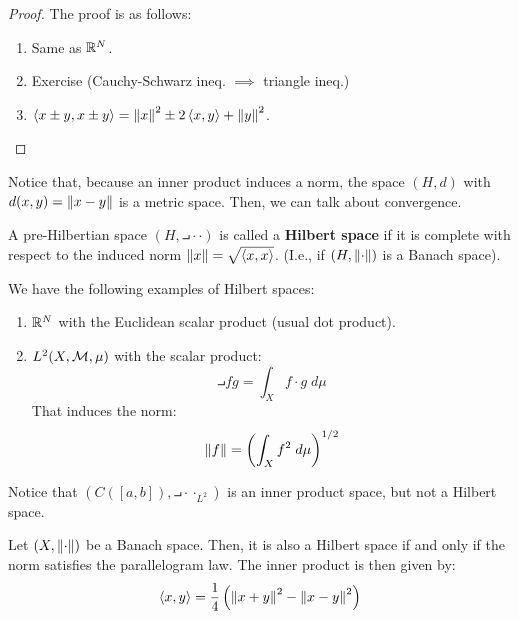 \begin{proof}
    The proof is as follows:
    \begin{enumerate}[label=\arabic*)]
        \item Same as $\mathbb{R}^N$.
        \item Exercise (Cauchy-Schwarz ineq. $\implies$ triangle ineq.)
        \item $\left\langle x \pm y, x \pm y \right\rangle = \left\|x\right\|^2 \pm 2\left\langle x, y \right\rangle + \left\|y\right\|^2$.
    \end{enumerate}
\end{proof}

\begin{fremark}
    Notice that, because an inner product induces a norm, the space $(H, d)$ with
    $d(x, y) = \left\|x - y\right\|$ is a metric space. Then, we can talk about convergence.
\end{fremark}

\vspace{1em}

\begin{fdefinition}
    A pre-Hilbertian space $(H, \intprod{\cdot}{\cdot})$ is called a \textbf{Hilbert space} if it is complete
    with respect to the induced norm $\left\|x\right\| = \sqrt{\left\langle x, x \right\rangle}$. (I.e., if 
    $(H, \left\|\cdot\right\|)$ is a Banach space).
\end{fdefinition}

\begin{example}
    We have the following examples of Hilbert spaces:
    \begin{enumerate}[label=\arabic*)]
        \item $\mathbb{R}^N$ with the Euclidean scalar product (usual dot product).
        \item $L^2(X, \mathcal{M}, \mu)$ with the scalar product:
        $$\intprod{f}{g} = \int_X f \cdot g \; d\mu$$
        That induces the norm:
        $$\left\|f\right\| = \left( \int_X f^2 \; d\mu \right)^{1/2}$$
    \end{enumerate}

    Notice that $(C([a, b]), \intprod{\cdot}{\cdot}_{L^2})$ is an inner product space, but not a Hilbert space. 
\end{example}

\begin{fproposition}
    Let $(X, \left\|\cdot\right\|)$ be a Banach space. Then, it is also a Hilbert space if and only if
    the norm satisfies the parallelogram law. The inner product is then given by:
    $$\left\langle x, y \right\rangle = \frac{1}{4} \left( \left\|x + y\right\|^2 - \left\|x - y\right\|^2 \right)$$
\end{fproposition}

